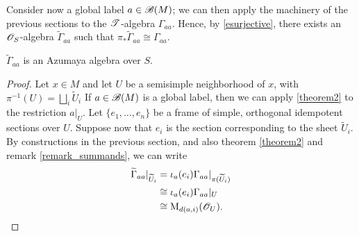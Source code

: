 

Consider now a global label $a\in \mathscr{B}(M)$; we can then apply the machinery of the previous sections to the $\mathscr{T}$-algebra $\Gamma_{aa}$. Hence, by \ref{esurjective}, there exists an $\mathscr{O}_S$-algebra $\widetilde{\Gamma}_{aa}$ such that $\pi_* \widetilde{\Gamma}_{aa}\cong \Gamma_{aa}$.

\begin{theorem}\label{azumaya_s}
$\widetilde{\Gamma}_{aa}$ is an Azumaya algebra over $S$.
\end{theorem}
\begin{proof}
Let $x\in M$ and let $U$ be a semisimple neighborhood of $x$, with $\pi^{-1}(U)=\bigsqcup_i\widetilde{U}_i$ If $a\in \mathscr{B}(M)$ is a global label, then we can apply \ref{theorem2} to the restriction $a|_U$. Let $\{e_1,\dots ,e_n\}$ be a frame of simple, orthogonal idempotent sections over $U$. Suppose now that $e_i$ is the section corresponding to the sheet $\widetilde{U}_i$. By constructions in the previous section, and also theorem \ref{theorem2} and remark \ref{remark_summands}, we can write
$$
\begin{aligned}
\widetilde{\Gamma}_{aa}|_{\widetilde{U}_i} &= \iota_a(e_i)\Gamma_{aa}|_{\pi (\widetilde{U}_i)} \\
																					 &\cong \iota_a(e_i)\Gamma_{aa}|_{U} \\
																					 &\cong \operatorname{M}_{d(a,i)}(\mathscr{O}_{U}). \\
\end{aligned}
$$
\end{proof}

